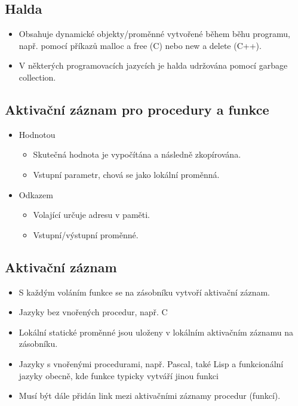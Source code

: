 \documentclass{szzclass}
\begin{document}
\subsection{Halda}
\begin{itemize}
\item Obsahuje dynamické objekty/proměnné vytvořené během běhu programu, např. pomocí příkazů malloc a free (C) nebo new a delete (C++).
\item V některých programovacích jazycích je halda udržována pomocí garbage collection.
\end{itemize}

\subsection{Aktivační záznam pro procedury a funkce}
\begin{itemize}
\item Hodnotou
  \begin{itemize}
  \item Skutečná hodnota je vypočítána a následně zkopírována.
  \item Vstupní parametr, chová se jako lokální proměnná.
  \end{itemize}
\item Odkazem
  \begin{itemize}
  \item Volající určuje adresu v paměti.
  \item Vstupní/výstupní proměnné.
  \end{itemize}
\end{itemize}

\subsection{Aktivační záznam}
\begin{itemize}
\item S každým voláním funkce se na zásobníku vytvoří aktivační záznam.
\item Jazyky bez vnořených procedur, např. C
\item Lokální statické proměnné jsou uloženy v lokálním aktivačním záznamu na zásobníku.
\item Jazyky s vnořenými procedurami, např. Pascal, také Lisp a funkcionální jazyky obecně, kde funkce typicky vytváří jinou funkci
\item Musí být dále přidán link mezi aktivačními záznamy procedur (funkcí).
\end{itemize}
\end{document}
